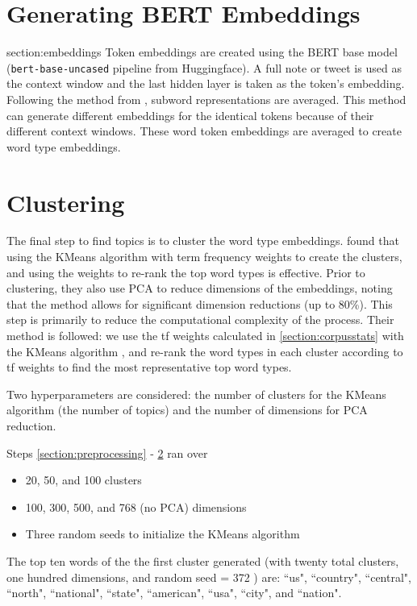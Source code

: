 \documentclass [11pt, proquest] {uwthesis}[2020/02/24]
\begin{document}
\section{Generating BERT Embeddings}{section:embeddings}
Token embeddings are created using the BERT base model \cite{DBLP:journals/corr/abs-1810-04805}  (\verb|bert-base-uncased| pipeline from Huggingface).
A full note or tweet is used as the context window and the last hidden layer is taken as the token’s embedding. Following the method from \cite{sia-etal-2020-tired}, subword representations are averaged. This method can generate different embeddings for the identical tokens because of their different context windows. These word token embeddings are averaged to create word type embeddings.

\section{Clustering}\label{section:clustering}

The final step to find topics is to cluster the word type embeddings. \cite{si-etal-2021-topic} found that using the KMeans algorithm with term frequency weights to create the clusters, and using the weights to re-rank the top word types is effective. Prior to clustering, they also use PCA to reduce dimensions of the embeddings, noting that the method allows for significant dimension reductions (up to 80\%). This step is primarily to reduce the computational complexity of the process. Their method is followed: we use the tf weights calculated in \ref{section:corpusstats} with the KMeans algorithm \citep{scikit-learn}, and re-rank the word types in each cluster according to tf weights to find the most representative top word types.

Two hyperparameters are considered: the number of clusters for the KMeans algorithm (the number of topics) and the number of dimensions for PCA reduction.

Steps \ref{section:preprocessing} - \ref{section:clustering} ran over
\begin{itemize}
  \item 20, 50, and 100 clusters
  \item 100, 300, 500, and 768 (no PCA) dimensions
  \item Three random seeds to initialize the KMeans algorithm
\end{itemize}

The top ten words of the the first cluster generated (with twenty total clusters, one hundred dimensions, and  random seed = 372 ) are: ``us", ``country", ``central", ``north", ``national", ``state", ``american", ``usa", ``city", and ``nation".
\end{document}

